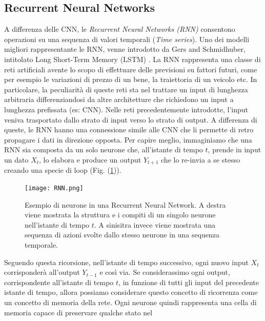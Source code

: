 \subsection{Recurrent Neural Networks}
A differenza delle CNN, le \emph{Recurrent Neural Networks (RNN)} consentono 
operazioni su una sequenza di valori temporali (\emph{Time series}). Uno dei 
modelli migliori rappresentante le RNN, venne introdotto da Gers and 
Schmidhuber, intitolato Long Short-Term Memory (LSTM) \cite{LSTM}. La RNN 
rappresenta una classe di reti artificiali avente lo scopo di effettuare delle 
previsioni su fattori futuri, come per esempio le variazioni di prezzo di 
un bene, la traiettoria di un veicolo etc. In particolare, la peculiarità di 
queste reti sta nel trattare un input di lunghezza arbitraria differenziandosi 
da altre architetture che richiedono un input a lunghezza prefissata (es: 
CNN). Nelle reti precedentemente introdotte, l'input veniva trasportato 
dallo strato di input verso lo strato di output. A differenza di queste, 
le RNN hanno una connessione simile alle CNN che li permette di retro 
propagare i dati in direzione opposta. Per capire meglio, immaginiamo 
che una RNN sia composta da un solo neurone che, all'istante di tempo 
$t$, prende in input un dato $X_t$, lo elabora e produce un output $Y_{t+1}$ che 
lo re-invia a se stesso creando una specie di loop (Fig. (\ref{neuron-rnn})).
\begin{figure}
    \centering
    \texttt{[image: RNN.png]}
    \centering
    \caption{Esempio di neurone in una Recurrent Neural Network. A destra viene mostrata la struttura e i compiti di un singolo neurone nell'istante di tempo $t$. A sinisitra invece viene mostrata una sequenza di azioni svolte dallo stesso neurone in una sequenza temporale.}
    \label{neuron-rnn}
\end{figure}
Seguendo 
questa ricorsione, nell'istante di tempo successivo, ogni nuovo input $X_t$ 
corrisponderà all'output $Y_{t-1}$ e così via.  Se considerassimo ogni output, 
corrispondente all'istante di tempo $t$, in funzione di tutti gli input del 
precedente istante di tempo, allora possiamo considerare questo concetto di 
ricorrenza come un concetto di memoria della rete. Ogni neurone quindi 
rappresenta una cella di memoria capace di preservare qualche stato nel 
